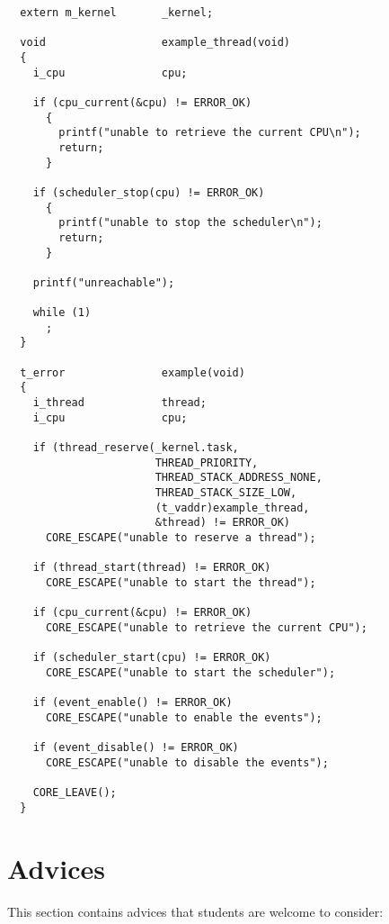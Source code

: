 \begin{verbatim}
  extern m_kernel       _kernel;

  void                  example_thread(void)
  {
    i_cpu               cpu;

    if (cpu_current(&cpu) != ERROR_OK)
      {
        printf("unable to retrieve the current CPU\n");
        return;
      }

    if (scheduler_stop(cpu) != ERROR_OK)
      {
        printf("unable to stop the scheduler\n");
        return;
      }

    printf("unreachable");

    while (1)
      ;
  }

  t_error               example(void)
  {
    i_thread            thread;
    i_cpu               cpu;

    if (thread_reserve(_kernel.task,
                       THREAD_PRIORITY,
                       THREAD_STACK_ADDRESS_NONE,
                       THREAD_STACK_SIZE_LOW,
                       (t_vaddr)example_thread,
                       &thread) != ERROR_OK)
      CORE_ESCAPE("unable to reserve a thread");

    if (thread_start(thread) != ERROR_OK)
      CORE_ESCAPE("unable to start the thread");

    if (cpu_current(&cpu) != ERROR_OK)
      CORE_ESCAPE("unable to retrieve the current CPU");

    if (scheduler_start(cpu) != ERROR_OK)
      CORE_ESCAPE("unable to start the scheduler");

    if (event_enable() != ERROR_OK)
      CORE_ESCAPE("unable to enable the events");

    if (event_disable() != ERROR_OK)
      CORE_ESCAPE("unable to disable the events");

    CORE_LEAVE();
  }
\end{verbatim}

%
%

\section{Advices}

This section contains advices that students are welcome to consider:

